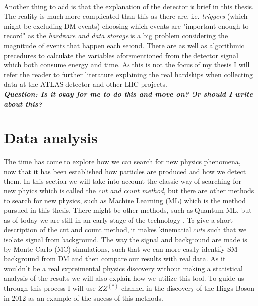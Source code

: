 \documentclass[14pt, a4paper]{book}
\begin{document}
\\Another thing to add is that the explanation of the detector is brief in this thesis. The reality is much more complicated than this as there are, i.e. \textit{triggers} (which might be excluding DM events) choosing which events are 
"important enough to record" as the \textit{hardware and data storage} is a big problem considering the magnitude of events that happen each second. There are as well as algorithmic precedures to calculate the variables aforementioned from the detector signal 
which both consume energy and time. As this is not the focus of my thesis I will refer the reader to further literature explaining the real hardships when collecting data at the ATLAS detector and other LHC projects. \cite{Trigger_1}\\
\textit{\textbf{Question: Is it okay for me to do this and move on? Or should I write about this?}}





\clearpage
\section{Data analysis}\label{sec:data_anal}
The time has come to explore how we can search for new physics phenomena, now that it has been established how particles are produced and how we detect them. In this section we will take into account the classic way of searching for new phyics which is called 
the \textit{cut and count method}, but there are other methods to search for new physics, such as Machine Learning (ML) which is the method pursued in this thesis. There might be other methods, such as 
Quantum ML, but as of today we are still in an early stage of the technology \cite{QML}. To give a short description of the cut and count method, it makes kinematial \textit{cuts} such that we isolate signal from background. The way 
the signal and background are made is by Monte Carlo (MC) simulations, such that we can more easily identify SM background from DM and then compare our results with real data. As it wouldn't be a real expreimental physics discovery without making a statistical 
analysis of the results we will also explain how we utilize this tool. To guide us through this process I will use $ZZ^{(*)}$ channel in the discovery of the Higgs Boson in 2012 \cite{Higgs_discovery_2012} as an example of the sucess of this methods.
\end{document}
